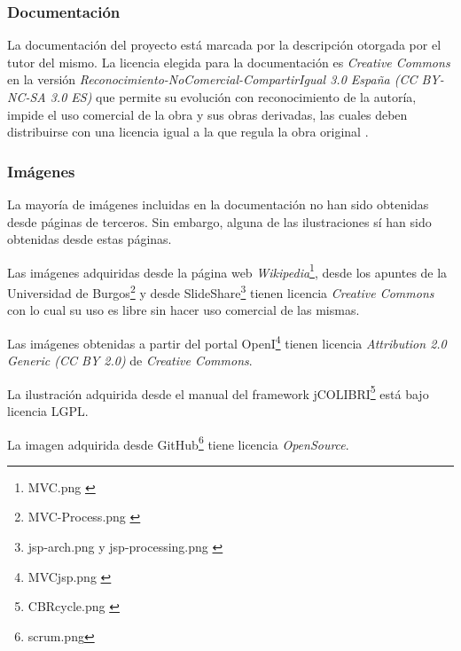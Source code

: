\subsubsection{Documentación}

La documentación del proyecto está marcada por la descripción otorgada por el tutor del mismo. La licencia elegida para la documentación es \emph{Creative Commons} en la versión \emph{Reconocimiento-NoComercial-CompartirIgual 3.0 España (CC BY-NC-SA 3.0 ES)} que permite su evolución con reconocimiento de la autoría, impide el uso comercial de la obra y sus obras derivadas, las cuales deben distribuirse con una licencia igual a la que regula la obra original \cite{cc:ncsa}.

\subsubsection{Imágenes}

La mayoría de imágenes incluidas en la documentación no han sido obtenidas desde páginas de terceros. Sin embargo, alguna de las ilustraciones sí han sido obtenidas desde estas páginas.

Las imágenes adquiridas desde la página web \emph{Wikipedia}\footnote{MVC.png \cite{img:mvc}}, desde los apuntes de la Universidad de Burgos\footnote{MVC-Process.png \cite{img:mvc2}} y desde SlideShare\footnote{jsp-arch.png \cite{img:jsp2} y jsp-processing.png \cite{img:jsp1}} tienen licencia \emph{Creative Commons} con lo cual su uso es libre sin hacer uso comercial de las mismas.

Las imágenes obtenidas a partir del portal OpenI\footnote{MVCjsp.png \cite{img:repo}} tienen licencia \emph{Attribution 2.0 Generic (CC BY 2.0)} de \emph{Creative Commons}.

La ilustración adquirida desde el manual del framework jCOLIBRI\footnote{CBRcycle.png \cite{img:cbr}} está bajo licencia LGPL.

La imagen adquirida desde GitHub\footnote{scrum.png\cite{img:scrum}} tiene licencia \emph{OpenSource}.


